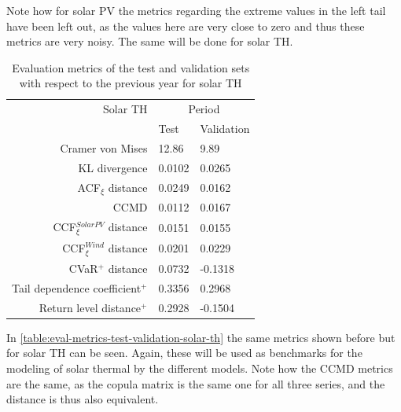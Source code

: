 Note how for solar PV the metrics regarding the extreme values in the left tail have been left out, as the values here are very close to zero and thus these metrics are very noisy. The same will be done for solar TH. 

\begin{table}[ht]
    \centering
    \begin{tabular}{rll}
        \toprule
        Solar TH & \multicolumn{2}{c}{Period} \\ 
        \cmidrule(lr){2-3}
            & Test & Validation \\
        \midrule
        Cramer von Mises & 12.86 & 9.89 \\
        KL divergence & 0.0102 & 0.0265 \\
        ACF$_\xi$ distance & 0.0249 & 0.0162 \\
        \midrule
        CCMD & 0.0112 & 0.0167 \\
        CCF$_\xi^{Solar PV}$ distance & 0.0151 & 0.0155 \\
        CCF$_\xi^{Wind}$ distance & 0.0201 & 0.0229 \\
        \midrule
        CVaR$^+$ distance & 0.0732 & -0.1318 \\
        Tail dependence coefficient$^+$ & 0.3356 & 0.2968 \\
        Return level distance$^+$ & 0.2928 & -0.1504 \\
        \bottomrule
    \end{tabular}
    \caption{Evaluation metrics of the test and validation sets with respect to the previous year for solar TH}
    \label{table:eval-metrics-test-validation-solar-th}
\end{table}

In \autoref{table:eval-metrics-test-validation-solar-th} the same metrics shown before but for solar TH can be seen. Again, these will be used as benchmarks for the modeling of solar thermal by the different models. Note how the CCMD metrics are the same, as the copula matrix is the same one for all three series, and the distance is thus also equivalent.

